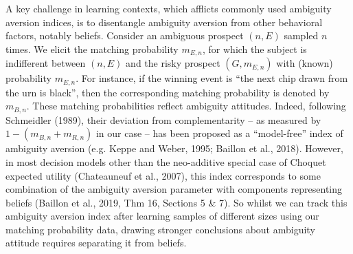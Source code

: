 \documentclass[12pt,a4paper]{article}
\newenvironment{original}
  {\par\vspace{0.5em}\noindent\color{black}\ignorespaces}
  {\par\vspace{0.3em}}
\begin{document}
\begin{original}
A key challenge in learning contexts, which afflicts commonly used ambiguity aversion indices, is to disentangle ambiguity aversion from other behavioral factors, notably beliefs. Consider an ambiguous prospect $(n, E)$ sampled $n$ times. We elicit the matching probability $m_{E,n}$, for which the subject is indifferent between $(n, E)$ and the risky prospect $(G, m_{E,n})$ with (known) probability $m_{E,n}$. For instance, if the winning event is ``the next chip drawn from the urn is black'', then the corresponding matching probability is denoted by $m_{B,n}$. These matching probabilities reflect ambiguity attitudes. Indeed, following Schmeidler (1989), their deviation from complementarity -- as measured by $1 - (m_{B,n} + m_{R,n})$ in our case -- has been proposed as a ``model-free'' index of ambiguity aversion (e.g. Keppe and Weber, 1995; Baillon et al., 2018). However, in most decision models other than the neo-additive special case of Choquet expected utility (Chateauneuf et al., 2007), this index corresponds to some combination of the ambiguity aversion parameter with components representing beliefs (Baillon et al., 2019, Thm 16, Sections 5 \& 7). So whilst we can track this ambiguity aversion index after learning samples of different sizes using our matching probability data, drawing stronger conclusions about ambiguity attitude requires separating it from beliefs.
\end{original}
\end{document}
